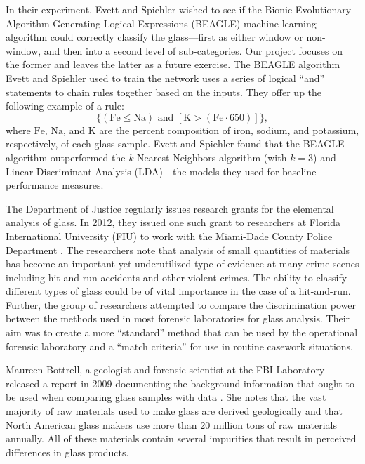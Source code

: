 \documentclass[12pt,halfline,a4paper]{ouparticle}
\begin{document}
In their experiment, Evett and Spiehler wished to see if the Bionic Evolutionary Algorithm Generating Logical Expressions (BEAGLE) machine learning algorithm could correctly classify the glass---first as either window or non-window, and then into a second level of sub-categories. Our project focuses on the former and leaves the latter as a future exercise. The BEAGLE algorithm Evett and Spiehler used to train the network uses a series of logical ``and'' statements to chain rules together based on the inputs. They offer up the following example of a rule: 
\begin{equation}
\{(\mathrm{Fe} \leq \mathrm{Na}) \text{ and } [\mathrm{K} > (\mathrm{Fe} \cdot 650)]\}, 
\end{equation}
where $\mathrm{Fe}$, $\mathrm{Na}$, and $\mathrm{K}$ are the percent composition of iron, sodium, and potassium, respectively, of each glass sample. Evett and Spiehler found that the BEAGLE algorithm outperformed the $k$-Nearest Neighbors algorithm (with $ k = 3$) and Linear Discriminant Analysis (LDA)---the models they used for baseline performance measures. 

The Department of Justice regularly issues research grants for the elemental analysis of glass. In 2012, they issued one such grant to researchers at Florida International University (FIU) to work with the Miami-Dade County Police Department \cite{almirall2012}. The researchers note that analysis of small quantities of materials has become an important yet underutilized type of evidence at many crime scenes including hit-and-run accidents and other violent crimes. The ability to classify different types of glass could be of vital importance in the case of a hit-and-run. Further, the group of researchers attempted to compare the discrimination power between the methods used in most forensic laboratories for glass analysis. Their aim was to create a more ``standard'' method that can be used by the operational forensic laboratory and a ``match criteria'' for use in routine casework situations.

Maureen Bottrell, a geologist and forensic scientist at the FBI Laboratory released a report in 2009 documenting the background information that ought to be used when comparing glass samples with data \cite{bottrell2009}. She notes that the vast majority of raw materials used to make glass are derived geologically and that North American glass makers use more than 20 million tons of raw materials annually. All of these materials contain several impurities that result in perceived differences in glass products. 
\end{document}
